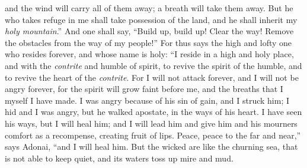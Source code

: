 \begin{biblechapter}
and the wind will carry all of them away; 
a breath will take them away. 
But he who takes refuge in me shall take possession of the land, 
and he shall inherit my \textit{holy mountain}.”
 And one shall say, “Build up, build up! Clear the way! 
Remove the obstacles from the way of my people!”
\verse For thus says the high and lofty one who resides forever, and whose name is holy:
\verse “I reside in a high and holy place, 
and with the \textit{contrite} and humble of spirit, 
to revive the spirit of the humble, 
and to revive the heart of the \textit{contrite}.
\verse For I will not attack forever, 
and I will not be angry forever, 
for the spirit will grow faint before me, 
and the breaths that I myself I have made.
\verse I was angry because of his sin of gain, and I struck him; 
I hid and I was angry, but he walked apostate, in the ways of his heart.
\verse I have seen his ways, but I will heal him; 
and I will lead him and give him and his mourners comfort as a recompense,
\verse creating fruit of lips. 
Peace, peace to the far and near,” says Adonai, “and I will heal him.
\verse But the wicked are like the churning sea, 
that is not able to keep quiet, 
and its waters toss up mire and mud.
\end{biblechapter}

